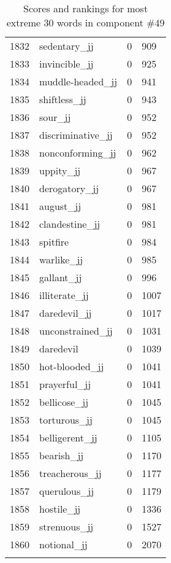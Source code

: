 \begin{longtable}[!htbp]{| rlr@{.}l |}
    1832 & sedentary\_jj & 0 & 909 \\
    1833 & invincible\_jj & 0 & 925 \\
    1834 & muddle-headed\_jj & 0 & 941 \\
    1835 & shiftless\_jj & 0 & 943 \\
    1836 & sour\_jj & 0 & 952 \\
    1837 & discriminative\_jj & 0 & 952 \\
    1838 & nonconforming\_jj & 0 & 962 \\
    1839 & uppity\_jj & 0 & 967 \\
    1840 & derogatory\_jj & 0 & 967 \\
    1841 & august\_jj & 0 & 981 \\
    1842 & clandestine\_jj & 0 & 981 \\
    1843 & spitfire & 0 & 984 \\
    1844 & warlike\_jj & 0 & 985 \\
    1845 & gallant\_jj & 0 & 996 \\
    1846 & illiterate\_jj & 0 & 1007 \\
    1847 & daredevil\_jj & 0 & 1017 \\
    1848 & unconstrained\_jj & 0 & 1031 \\
    1849 & daredevil & 0 & 1039 \\
    1850 & hot-blooded\_jj & 0 & 1041 \\
    1851 & prayerful\_jj & 0 & 1041 \\
    1852 & bellicose\_jj & 0 & 1045 \\
    1853 & torturous\_jj & 0 & 1045 \\
    1854 & belligerent\_jj & 0 & 1105 \\
    1855 & bearish\_jj & 0 & 1170 \\
    1856 & treacherous\_jj & 0 & 1177 \\
    1857 & querulous\_jj & 0 & 1179 \\
    1858 & hostile\_jj & 0 & 1336 \\
    1859 & strenuous\_jj & 0 & 1527 \\
    1860 & notional\_jj & 0 & 2070 \\
    \hline
    \caption{Scores and rankings for most extreme 30 words in component \#49} \\
\end{longtable}
